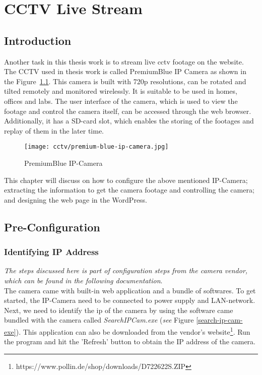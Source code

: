\chapter{CCTV Live Stream}

\section{Introduction}
Another task in this thesis work is to stream live \ac{cctv} footage on the website. The CCTV used in thesis work is called PremiumBlue IP Camera \cite{PremiumBlue.2013} \cite{PremiumBlue.2013b} as shown in the Figure~\ref{fig:premium-blue-ip-camera}. This camera is built with 720p resolutions, can be rotated and tilted remotely and monitored wirelessly. It is suitable to be used in homes, offices and labs. The user interface of the camera, which is used to view the footage and control the camera itself, can be accessed through the web browser. Additionally, it has a SD-card slot, which enables the storing of the footages and replay of them in the later time.

\begin{figure}[ht]
\caption{PremiumBlue IP-Camera}
\label{fig:premium-blue-ip-camera}
\centering
\texttt{[image: cctv/premium-blue-ip-camera.jpg]}
\end{figure}

This chapter will discuss on how to configure the above mentioned IP-Camera; extracting the information to get the camera footage and controlling the camera; and designing the web page in the WordPress.

\section{Pre-Configuration}
\subsection*{Identifying IP Address}\label{sec:cctv-identifying-ip-address}
\emph{The steps discussed here is part of configuration steps from the camera vendor, which can be found in the following documentation}\cite{PremiumBlue.2013c}.\\

The camera came with built-in web application and a bundle of softwares. To get started, the IP-Camera need to be connected to power supply and LAN-network. Next, we need to identify the \ac{ip} of the camera by using the software came bundled with the camera called \emph{SearchIPCam.exe} (\emph{see} Figure \ref{search-ip-cam-exe}). This application can also be downloaded from the vendor's website\footnote{https://www.pollin.de/shop/downloads/D722622S.ZIP}. Run the program and hit the 'Refresh' button to obtain the IP address of the camera.

